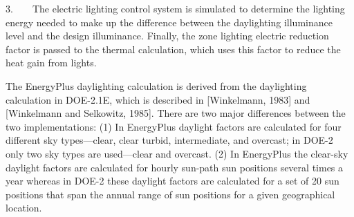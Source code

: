 3.~~~~The electric lighting control system is simulated to determine the lighting energy needed to make up the difference between the daylighting illuminance level and the design illuminance. Finally, the zone lighting electric reduction factor is passed to the thermal calculation, which uses this factor to reduce the heat gain from lights.

The EnergyPlus daylighting calculation is derived from the daylighting calculation in DOE-2.1E, which is described in {[}Winkelmann, 1983{]} and {[}Winkelmann and Selkowitz, 1985{]}. There are two major differences between the two implementations: (1) In EnergyPlus daylight factors are calculated for four different sky types---clear, clear turbid, intermediate, and overcast; in DOE-2 only two sky types are used---clear and overcast. (2) In EnergyPlus the clear-sky daylight factors are calculated for hourly sun-path sun positions several times a year whereas in DOE-2 these daylight factors are calculated for a set of 20 sun positions that span the annual range of sun positions for a given geographical location.
